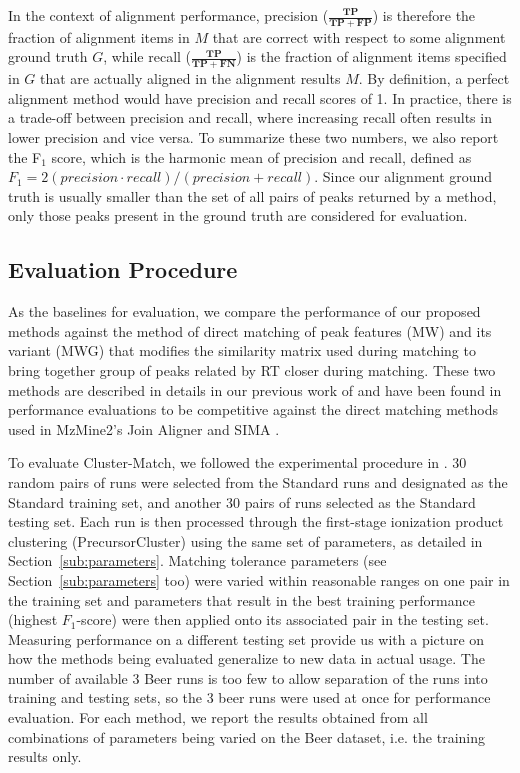 In the context of alignment performance, precision ($\frac{\boldsymbol{TP}}{\boldsymbol{TP}+\boldsymbol{FP}}$) is therefore the fraction of alignment items in $M$ that are correct with respect to some alignment ground truth $G$, while recall ($\frac{\boldsymbol{TP}}{\boldsymbol{TP}+\boldsymbol{FN}}$) is the fraction of alignment items specified in $G$ that are actually aligned in the alignment results $M$. By definition, a perfect alignment method would have precision and recall scores of 1. In practice, there is a trade-off between precision and recall, where increasing recall often results in lower precision and vice versa. To summarize these two numbers, we also report the F$_1$ score, which is the harmonic mean of precision and recall, defined as $F_1 = 2(precision\cdot recall)/(precision + recall)$. Since our alignment ground truth is usually smaller than the set of all pairs of peaks returned by a method, only those peaks present in the ground truth are considered for evaluation. 

\subsection{Evaluation Procedure\label{sub:evaluation_procedure}}

As the baselines for evaluation, we compare the performance of our proposed methods against the method of direct matching of peak features (MW) and its variant (MWG) that modifies the similarity matrix used during matching to bring together group of peaks related by RT closer during matching. These two methods are described in details in our previous work of \cite{Wandy2015} and have been found in performance evaluations to be competitive against the direct matching methods used in MzMine2's Join Aligner \cite{Pluskal2010} and SIMA \cite{Voss2011a}.

To evaluate Cluster-Match, we followed the experimental procedure in \cite{Wandy2015}. 30 random pairs of runs were selected from the Standard runs and designated as the Standard training set, and another 30 pairs of runs selected as the Standard testing set. Each run is then processed through the first-stage ionization product clustering (PrecursorCluster) using the same set of parameters, as detailed in Section~\ref{sub:parameters}. Matching tolerance parameters (see Section~\ref{sub:parameters} too) were varied within reasonable ranges on one pair in the training set and parameters that result in the best training performance (highest $F_1$-score) were then applied onto its associated pair in the testing set. Measuring performance on a different testing set provide us with a picture on how the methods being evaluated generalize to new data in actual usage. The number of available 3 Beer runs is too few to allow separation of the runs into training and testing sets, so the 3 beer runs were used at once for performance evaluation. For each method, we report the results obtained from all combinations of parameters being varied on the Beer dataset, i.e. the training results only.

